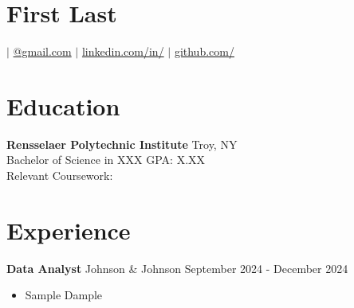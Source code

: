 \documentclass{article} %
\begin{document}
\section*{\Large First Last}
\href{tel:}{} $|$
\href{mailto:@gmail.com}{@gmail.com} $|$
\href{https://linkedin.com/in/}{linkedin.com/in/} $|$
\href{https://github.com/}{github.com/}

\section*{\Large Education}
\textbf{Rensselaer Polytechnic Institute} \hfill Troy, NY \\
Bachelor of Science in XXX
GPA: X.XX \\
Relevant Coursework: 

\section*{\Large Experience}

\textbf{Data Analyst} \hfill Johnson \& Johnson \hfill September 2024 - December 2024
\begin{itemize}
    \item Sample Dample
\end{itemize}
\end{document}
